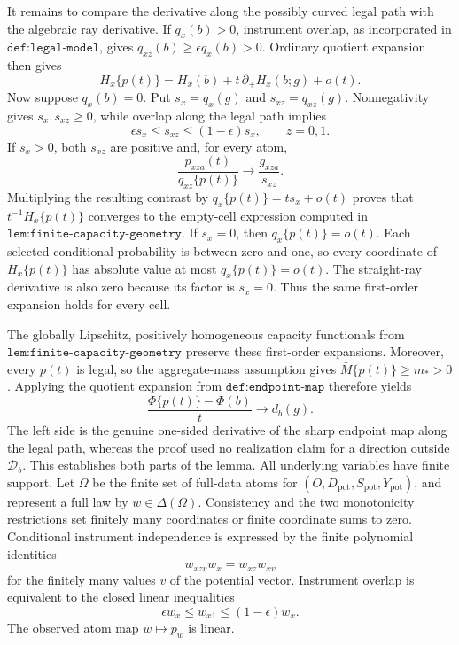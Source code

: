 It remains to compare the derivative along the possibly curved legal path with the algebraic ray derivative.  If \(q_x(b)>0\), instrument overlap, as incorporated in \(\texttt{def:legal-model}\), gives \(q_{xz}(b)\ge\epsilon q_x(b)>0\).  Ordinary quotient expansion then gives
\[
H_x\{p(t)\}=H_x(b)+t\,\partial_+H_x(b;g)+o(t).
\]
Now suppose \(q_x(b)=0\).  Put \(s_x=q_x(g)\) and \(s_{xz}=q_{xz}(g)\).  Nonnegativity gives \(s_x,s_{xz}\ge0\), while overlap along the legal path implies
\[
\epsilon s_x\le s_{xz}\le(1-\epsilon)s_x,
\qquad z=0,1.
\]
If \(s_x>0\), both \(s_{xz}\) are positive and, for every atom,
\[
\frac{p_{xza}(t)}{q_{xz}\{p(t)\}}\longrightarrow \frac{g_{xza}}{s_{xz}}.
\]
Multiplying the resulting contrast by \(q_x\{p(t)\}=ts_x+o(t)\) proves that \(t^{-1}H_x\{p(t)\}\) converges to the empty-cell expression computed in \(\texttt{lem:finite-capacity-geometry}\).  If \(s_x=0\), then \(q_x\{p(t)\}=o(t)\).  Each selected conditional probability is between zero and one, so every coordinate of \(H_x\{p(t)\}\) has absolute value at most \(q_x\{p(t)\}=o(t)\).  The straight-ray derivative is also zero because its factor is \(s_x=0\).  Thus the same first-order expansion holds for every cell.

The globally Lipschitz, positively homogeneous capacity functionals from \(\texttt{lem:finite-capacity-geometry}\) preserve these first-order expansions.  Moreover, every \(p(t)\) is legal, so the aggregate-mass assumption gives \(\bar M\{p(t)\}\ge m_*>0\).  Applying the quotient expansion from \(\texttt{def:endpoint-map}\) therefore yields
\[
\frac{\Phi\{p(t)\}-\Phi(b)}{t}\longrightarrow d_b(g).
\]
The left side is the genuine one-sided derivative of the sharp endpoint map along the legal path, whereas the proof used no realization claim for a direction outside \(\mathcal D_b\).  This establishes both parts of the lemma.
All underlying variables have finite support.  Let \(\Omega\) be the finite set of full-data atoms for \((O,D_{\mathrm{pot}},S_{\mathrm{pot}},Y_{\mathrm{pot}})\), and represent a full law by \(w\in\Delta(\Omega)\).  Consistency and the two monotonicity restrictions set finitely many coordinates or finite coordinate sums to zero.  Conditional instrument independence is expressed by the finite polynomial identities
\[
w_{xzv}w_x=w_{xz}w_{xv}
\]
for the finitely many values \(v\) of the potential vector.  Instrument overlap is equivalent to the closed linear inequalities
\[
\epsilon w_x\le w_{x1}\le(1-\epsilon)w_x.
\]
The observed atom map \(w\mapsto p_w\) is linear.

